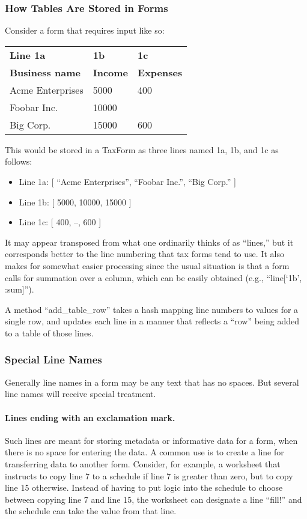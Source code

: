 \subsubsection{How Tables Are Stored in Forms}

Consider a form that requires input like so:
\begin{center}
\begin{tabular}{|l|l|l|}
\hline
\textbf{Line 1a} & \textbf{1b} & \textbf{1c} \\
\textbf{Business name} & \textbf{Income} & \textbf{Expenses} \\
\hline
Acme Enterprises & 5000 & 400 \\
\hline
Foobar Inc. & 10000 & \\
\hline
Big Corp. & 15000 & 600 \\
\hline
\end{tabular}
\end{center}
This would be stored in a TaxForm as three lines named 1a, 1b, and 1c as
follows:
\begin{itemize}
\item Line 1a: [ ``Acme Enterprises'', ``Foobar Inc.'', ``Big Corp.'' ]
\item Line 1b: [ 5000, 10000, 15000 ]
\item Line 1c: [ 400, --, 600 ]
\end{itemize}
It may appear transposed from what one ordinarily thinks of as ``lines,'' but it
corresponds better to the line numbering that tax forms tend to use. It also
makes for somewhat easier processing since the usual situation is that a form
calls for summation over a column, which can be easily obtained (e.g.,
``line[`1b', :sum]'').

A method ``add\_table\_row'' takes a hash mapping line numbers to values for a
single row, and updates each line in a manner that reflects a ``row'' being
added to a table of those lines.

\subsubsection{Special Line Names}

Generally line names in a form may be any text that has no spaces. But several
line names will receive special treatment.

\paragraph{Lines ending with an exclamation mark.} Such lines are meant for
storing metadata or informative data for a form, when there is no space for
entering the data. A common use is to create a line for transferring data to
another form. Consider, for example, a worksheet that instructs to copy line 7
to a schedule if line 7 is greater than zero, but to copy line 15 otherwise.
Instead of having to put logic into the schedule to choose between copying line
7 and line 15, the worksheet can designate a line ``fill!\@'' and the schedule
can take the value from that line.

